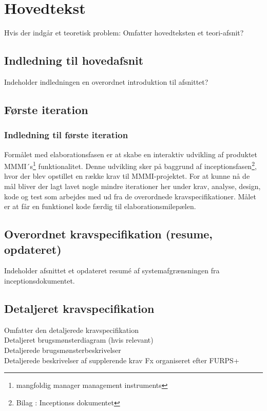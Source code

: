 \chapter{Hovedtekst}
Hvis der indgår et teoretisk problem: Omfatter hovedteksten et teori-afsnit?\\
\section{Indledning til hovedafsnit}
Indeholder indledningen en overordnet introduktion til afsnittet?\\
\section{Første iteration}
\subsection{Indledning til første iteration}
Formålet med elaborationsfasen er at skabe en interaktiv udvikling af produktet MMMI´s\footnote{{mangfoldig manager management instruments}} funktionalitet. Denne udvikling sker på baggrund af inceptionsfasen\footnote{{Bilag : Inceptionss dokumentet}}, hvor der blev opstillet en række krav til MMMI-projektet.  For at kunne nå de mål bliver der lagt lavet nogle mindre iterationer her under krav, analyse, design, kode og test som arbejdes med ud fra de overordnede kravspecifikationer. Målet er at får en funktionel kode færdig til elaborationsmilepælen. 



\section{Overordnet kravspecifikation (resume, opdateret)}
Indeholder afsnittet et opdateret resumé  af systemafgrænsningen fra inceptionsdokumentet.
\section{Detaljeret kravspecifikation}
Omfatter den detaljerede kravspecifikation\\
Detaljeret brugsmønsterdiagram (hvis relevant)\\
Detaljerede brugsmønsterbeskrivelser\\
Detaljerede beskrivelser af supplerende krav Fx organiseret efter FURPS+\\







